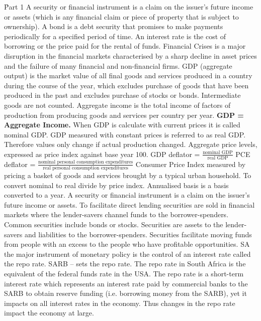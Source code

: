 \documentclass[12pt]{examnotes}
\begin{document}
\obeylines  
\setlength\baselineskip{15pt}

\h{Part 1}
\ra A security or financial instrument is a claim on the issuer’s future income or assets (which is any financial claim or piece of property that is subject to ownership). 
\ra A bond is a debt security that promises to make payments periodically for a specified period of time. 
\ra An interest rate is the cost of borrowing or the price paid for the rental of funds. 
\ra Financial Crises is a  major disruption in the financial markets characterised by a sharp decline in asset prices and the failure of many financial and non-financial firms. 
\ra GDP (aggregate output) is the market value of all final goods and services produced in a country during the course of the year, which excludes purchase of goods that have been produced in the past and excludes purchase of stocks or bonds. Intermediate goods are not counted.
\ra Aggregate income is the total income of factors of production from producing goods and services per country per year. {\bf GDP = Aggregate Income.} 
\ra When GDP is calculate with current prices it is called nominal GDP. 
\ra GDP measured with constant prices is referred to as real GDP. Therefore values only change if actual production changed.
 Aggregate price levels, expressed as price index against base year 100.
\vspace{6pt}
 GDP deflator =  $\displaystyle\frac{\text{nominal GDP}}{\text{real GDP}}$ 
\vspace{6pt}
 PCE deflator =  $\displaystyle\frac{\text{nominal personal consumption expenditures}}{\text{real personal consumption expenditures}}$ 
\vspace{6pt}
 Consumer Price Index measured by pricing a basket of goods and services brought by a typical urban household.
\ra To convert nominal to real divide by price index. Annualised basis is a basis converted to a year. 
\vspace{6pt}
\ra A security or financial instrument is a claim on the issuer's future income or assets. 
\ra To facilitate direct lending securities are sold in financial markets where the lender-savers channel funds to the borrower-spenders. 
\ra Common securities include bonds or stocks. 
\ra Securities are assets to the lender-savers and liabilities to the borrower-spenders. 
\ra Securities facilitate moving funds from people with an excess to the people who have profitable opportunities. 
\ra SA the major instrument of monetary policy is the control of an interest rate called the repo rate. \ra SARB – sets the repo rate.
\ra The repo rate in South Africa is the equivalent of the federal funds rate in the USA.
\ra The repo rate is a short-term interest rate which represents an interest rate paid by commercial banks to the SARB to obtain reserve funding (i.e. borrowing money from the SARB), yet it impacts on all interest rates in the economy. Thus changes in the repo rate impact the economy at large.
\end{document}

